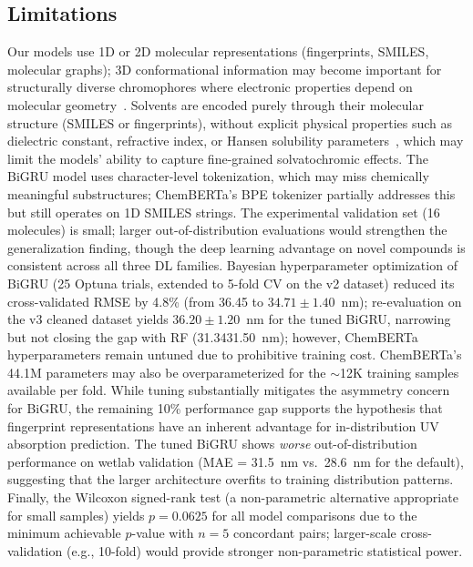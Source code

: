 \documentclass[journal=jcisd8,manuscript=article]{achemso}
\newcommand{\added}[1]{{\color{addedblue}#1}}
\newcommand{\removed}[1]{{\color{removedred}#1}}
\begin{document}
\subsection*{Limitations}
Our models use 1D or 2D molecular representations (fingerprints, SMILES, molecular graphs); 3D conformational information may become important for structurally diverse chromophores where electronic properties depend on molecular geometry~\cite{lupopasini2023excited}.
Solvents are encoded purely through their molecular structure (SMILES or fingerprints), without explicit physical properties such as dielectric constant, refractive index, or Hansen solubility parameters~\cite{reichardt2011solvents}, which may limit the models' ability to capture fine-grained solvatochromic effects.
The BiGRU model uses character-level tokenization, which may miss chemically meaningful substructures; ChemBERTa's BPE tokenizer partially addresses this but still operates on 1D SMILES strings.
The experimental validation set (16 molecules) is small; larger out-of-distribution evaluations would strengthen the generalization finding, though the deep learning advantage on novel compounds is consistent across all three DL families.
Bayesian hyperparameter optimization of BiGRU (25 Optuna trials, extended to 5-fold CV \added{on the v2 dataset}) reduced its cross-validated RMSE by 4.8\% (from 36.45 to $34.71 \pm 1.40$~nm)\added{; re-evaluation on the v3 cleaned dataset yields $36.20 \pm 1.20$~nm for the tuned BiGRU}, narrowing but not closing the gap with RF (\removed{31.34}\added{31.50}~nm); however, ChemBERTa hyperparameters remain untuned due to prohibitive training cost.
ChemBERTa's 44.1M parameters may also be overparameterized for the $\sim$12K training samples available per fold.
While tuning substantially mitigates the asymmetry concern for BiGRU, the remaining 10\% performance gap supports the hypothesis that fingerprint representations have an inherent advantage for in-distribution UV absorption prediction.
The tuned BiGRU shows \textit{worse} out-of-distribution performance on wetlab validation (MAE = 31.5~nm vs.\ 28.6~nm for the default), suggesting that the larger architecture overfits to training distribution patterns.
Finally, the Wilcoxon signed-rank test (a non-parametric alternative appropriate for small samples) yields $p = 0.0625$ for all model comparisons due to the minimum achievable $p$-value with $n = 5$ concordant pairs; larger-scale cross-validation (e.g., 10-fold) would provide stronger non-parametric statistical power.
\end{document}
